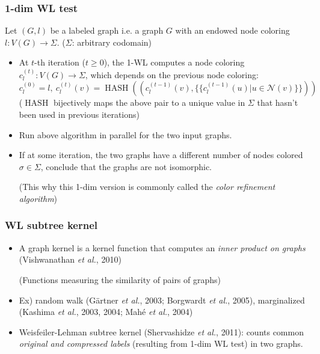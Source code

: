 \documentclass{beamer}
\DeclareMathOperator{\hash}{HASH}
\begin{document}
\begin{frame}
\frametitle{1-dim WL test}

Let $(G, l)$ be a labeled graph i.e. a graph $G$ with an endowed node coloring $l : V(G) \rightarrow \Sigma$.
($\Sigma$: arbitrary codomain)

\begin{itemize}
	\item At $t$-th iteration ($t \geq 0$), the 1-WL computes a node coloring $c_l^{(t)} : V(G) \rightarrow \Sigma$, which depends on the previous node coloring:
	$$c_l^{(0)} = l, \ c_l^{(t)}(v) = \hash \left( \left( c_l^{(t - 1)}(v), \{\{ c_l^{(t - 1)}(u) | u \in \mathscr{N}(v) \}\} \right) \right)$$	
($\hash$ bijectively maps the above pair to a unique value in $\Sigma$ that hasn't been used in previous iterations)	
	\pause
	
	\item Run above algorithm in parallel for the two input graphs. \pause
	
	\item If at some iteration, the two graphs have a different number of nodes colored $\sigma \in \Sigma$, conclude that the graphs are not isomorphic. \pause
	
	(This why this 1-dim version is commonly called the {\it color refinement algorithm})
\end{itemize}

\end{frame}

\begin{frame}
\frametitle{WL subtree kernel}

\begin{itemize}
	\item A graph kernel is a kernel function that computes an {\it inner product on graphs} (Vishwanathan {\it et al.}, 2010)
	
(Functions measuring the similarity of pairs of graphs) \pause

	\item Ex) random walk (G\"artner {\it et al.}, 2003; Borgwardt {\it et al.}, 2005), marginalized (Kashima {\it et al.}, 2003, 2004; Mah\'e {\it et al.}, 2004) \pause
	
	\item Weisfeiler-Lehman subtree kernel (Shervashidze {\it et al.}, 2011): counts common {\it original and compressed labels} (resulting from 1-dim WL test) in two graphs.
\end{itemize}

\end{frame}
\end{document}
